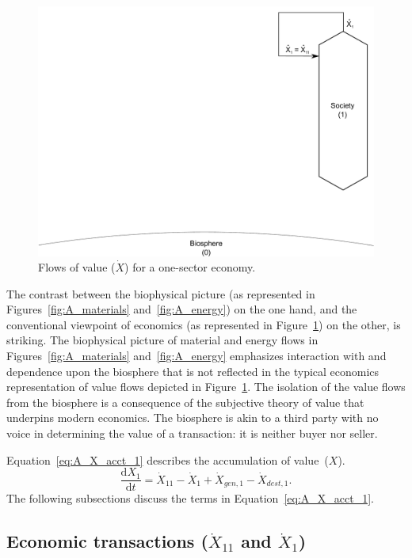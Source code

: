 \begin{landscape}
\begin{figure}[!ht]
\centering
\includegraphics[width=0.8\linewidth]{Part_2/Chapter_Values/images/1_sector_value.pdf}
\caption[Flows of value for a one-sector economy]{Flows of value ($\dot{X}$) for a one-sector economy.}
\label{fig:A_value} 
\end{figure}
\end{landscape}

The contrast between the biophysical picture
(as represented in Figures~\ref{fig:A_materials} and~\ref{fig:A_energy})
on the one hand, 
and the conventional viewpoint of economics
(as represented in Figure~\ref{fig:A_value}) 
on the other, is striking.  
The biophysical picture of material and energy flows in 
Figures~\ref{fig:A_materials} and~\ref{fig:A_energy} 
emphasizes interaction with and dependence upon the biosphere 
that is not reflected in the typical economics representation of 
value flows depicted in Figure~\ref{fig:A_value}.
The isolation of the value flows from the biosphere is a consequence
of the subjective theory of value
that underpins modern economics.
The biosphere is akin to a third party with no voice 
in determining the value of a transaction:
it is neither buyer nor seller. 

Equation~\ref{eq:A_X_acct_1} describes the accumulation 
of value~($X$).
%
\begin{equation} \label{eq:A_X_acct_1}
	\frac{\mathrm{d}X_{1}}{\mathrm{d}t} 
	= \dot{X}_{11} 
	- \dot{X}_{1}
	+ \dot{X}_{gen,1}
	- \dot{X}_{dest,1}.
\end{equation}
%
The following subsections discuss the terms in Equation~\ref{eq:A_X_acct_1}.
%

\subsection[Economic transactions]{Economic transactions ($\dot{X}_{11}$ and $\dot{X}_{1}$)}

